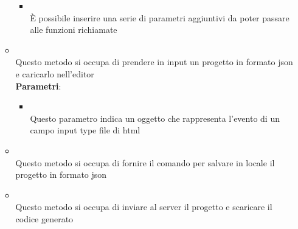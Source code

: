 \begin{itemize}
\begin{itemize}
\begin{itemize}
\item {}
\\ È possibile inserire una serie di parametri aggiuntivi da poter passare alle funzioni richiamate
\end{itemize}
\item {}
\\ Questo metodo si occupa di prendere in input un progetto in formato json e caricarlo nell'editor
\\ \textbf{Parametri}:
\begin{itemize}
\item {}
\\ Questo parametro indica un oggetto che rappresenta l'evento di un campo input type file di html
\end{itemize}
\item {}
\\ Questo metodo si occupa di fornire il comando per salvare in locale il progetto in formato json
\item {}
\\ Questo metodo si occupa di inviare al server il progetto e scaricare il codice generato
\end{itemize}
\end{itemize}

